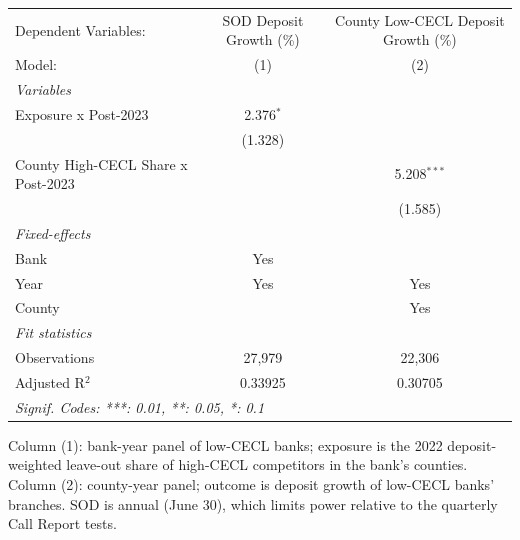 
\begingroup
\centering
\begin{tabular}{lcc}
   \tabularnewline \midrule \midrule
   Dependent Variables:               & SOD Deposit Growth (\%)  & County Low-CECL Deposit Growth (\%)\\   
   Model:                             & (1)                      & (2)\\  
   \midrule
   \emph{Variables}\\
   Exposure x Post-2023               & 2.376$^{*}$              &   \\   
                                      & (1.328)                  &   \\   
   County High-CECL Share x Post-2023 &                          & 5.208$^{***}$\\   
                                      &                          & (1.585)\\   
   \midrule
   \emph{Fixed-effects}\\
   Bank                               & Yes                      & \\  
   Year                               & Yes                      & Yes\\  
   County                             &                          & Yes\\  
   \midrule
   \emph{Fit statistics}\\
   Observations                       & 27,979                   & 22,306\\  
   Adjusted R$^2$                     & 0.33925                  & 0.30705\\  
   \midrule \midrule
   \multicolumn{3}{l}{\emph{Signif. Codes: ***: 0.01, **: 0.05, *: 0.1}}\\
\end{tabular}
 
\par \raggedright 
Column (1): bank-year panel of low-CECL banks; exposure is the 2022 deposit-weighted leave-out share of high-CECL competitors in the bank's counties. Column (2): county-year panel; outcome is deposit growth of low-CECL banks' branches. SOD is annual (June 30), which limits power relative to the quarterly Call Report tests.
\par\endgroup


